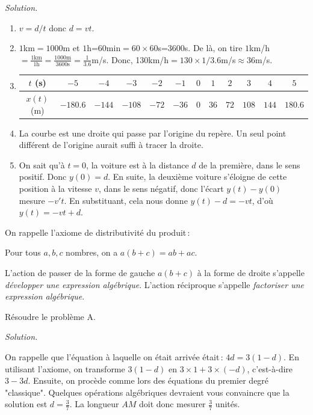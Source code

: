 			\textit{Solution.} 
			\begin{enumerate}
				\item $v=d/t$ donc $d=vt$.
				\item $1$km$=1000$m et $1$h=$60$min$=60\times 60$s=$3600$s. De là, on tire $1$km/h $=\frac{1\text{km}}{1\text{h}}=\frac{1000\text{m}}{3600\text{s}}=\frac{1}{3.6}$m/s. Donc, 130km/h$=130\times 1/3.6$m/s$\approx 36$m/s.
				\item 

				\begin{tabular}{c|c|c|c|c|c|c|c|c|c|c|c}
					$t$ (s) &$     -5 $&$    -4$&$  -3 $&$   -2 $&$ -1$&$ 0$&$ 1 $&$  2 $&$ 3$&$ 4  $&$ 5 $\\
					\hline
					$x(t)$ (m)&$-180.6 $&$ -144 $&$-108 $&$ -72  $&$-36$&$ 0$&$ 36$&$ 72 $&$108$&$ 144 $& $180.6$ 
				\end{tabular}
				\item La courbe est une droite qui passe par l'origine du repère. Un seul point différent de l'origine aurait suffi à tracer la droite.
				\item On sait qu'à $t=0$, la voiture est à la distance $d$ de la première, dans le sens positif. Donc $y(0)=d$. En suite, la deuxième voiture s'éloigne de cette position à la vitesse $v$, dans le sens négatif, donc l'écart $y(t)-y(0)$ mesure $-v't$. En substituant, cela nous donne $y(t)-d=-vt$, d'où $y(t)=-vt+d$.

			\end{enumerate}

			\begin{exo}
				On rappelle l'axiome de distributivité du produit\,: 

				\begin{axi}
					Pour tous $a,b,c$ nombres, on a $a(b+c)=a b+ a c$.
				\end{axi}	

				L'action de passer de la forme de gauche $a(b+c)$ à la forme de droite s'appelle \emph{développer une expression algébrique}. L'action réciproque s'appelle \emph{factoriser une expression algébrique}.

				Résoudre le problème A.				
			\end{exo}

			\noindent\emph{Solution.}

			On rappelle que l'équation à laquelle on était arrivée était\,: $4d=3(1-d)$. En utilisant l'axiome, on transforme $3(1-d)$ en $3\times 1+3\times(-d)$, c'est-à-dire $3-3d$. Ensuite, on procède comme lors des équations du premier degré "classique". Quelques opérations algébriques devraient vous convaincre que la solution est $d=\frac{3}{7}$. La longueur $AM$ doit donc mesurer $\frac{3}{7}$ unités. 


